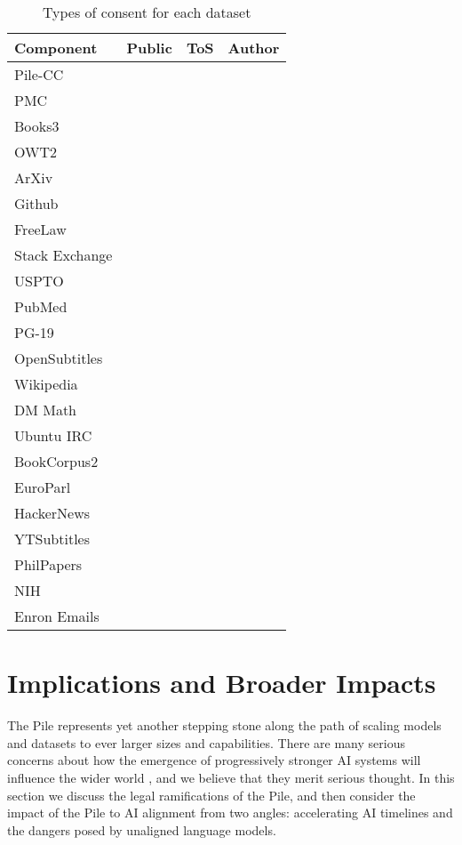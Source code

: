 \documentclass[11pt,a4paper]{article}
\newcommand{\cmark}{\ding{51}}%
\begin{document}
\begin{table}
    \centering
    \begin{tabularx}{\columnwidth}{l|c c c}
        \hline
        \textbf{Component} & \textbf{Public} & \textbf{ToS} & \textbf{Author} \\
        \midrule
        Pile-CC & \cmark & \cmark & \\
        PMC & \cmark & \cmark & \cmark\\
        Books3 & \cmark & & \\
        OWT2 & \cmark & & \\
        ArXiv & \cmark & \cmark & \cmark\\
        Github & \cmark & \cmark & \\
        FreeLaw & \cmark & \cmark & \cmark\\
        Stack Exchange & \cmark & \cmark & \cmark\\
        USPTO & \cmark & \cmark & \cmark\\
        PubMed & \cmark & \cmark & \cmark\\
        PG-19 & \cmark & \cmark & \\
        OpenSubtitles & \cmark & & \\
        Wikipedia & \cmark & \cmark & \cmark\\
        DM Math & \cmark & \cmark & \cmark\\
        Ubuntu IRC & \cmark & \cmark & \cmark\\
        BookCorpus2 & \cmark & & \\
        EuroParl & \cmark & \cmark & \cmark\\
        HackerNews & \cmark & \cmark & \\
        YTSubtitles & \cmark & & \\
        PhilPapers & \cmark & \cmark & \cmark\\
        NIH & \cmark & \cmark & \cmark\\
        Enron Emails & \cmark & \cmark & \\
        \hline
    \end{tabularx}
    \caption{Types of consent for each dataset}
    \label{table:consent}
\end{table}

\section{Implications and Broader Impacts}

The Pile represents yet another stepping stone along the path of scaling models and datasets to ever larger sizes and capabilities. There are many serious concerns about how the emergence of progressively stronger AI systems will influence the wider world \citep{brundage_malicious_2018,amodei_concrete_2016,bostrom2014ethics,bostrom2014superintelligence,critch2020ai}, and we believe that they merit serious thought. In this section we discuss the legal ramifications of the Pile, and then consider the impact of the Pile to AI alignment from two angles: accelerating AI timelines and the dangers posed by unaligned language models.
\end{document}

